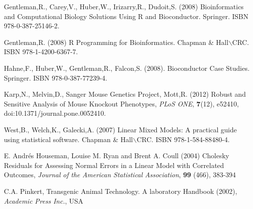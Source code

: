 \documentclass[12pt,a4paper]{article}
\begin{document}
\begin{thebibliography}{}

Gentleman,R., Carey,V., Huber,W., Irizarry,R., Dudoit,S.  (2008) Bioinformatics and Computational Biology Solutions Using R and Bioconductor. Springer.  ISBN 978-0-387-25146-2.

Gentleman,R. (2008) R Programming for Bioinformatics. Chapman \& Hall$\backslash$CRC. ISBN 978-1-4200-6367-7.

Hahne,F., Huber,W., Gentleman,R., Falcon,S. (2008). Bioconductor Case Studies. Springer.  ISBN 978-0-387-77239-4.

 Karp,N., Melvin,D., Sanger Mouse Genetics Project, Mott,R. (2012) Robust and Sensitive Analysis of Mouse Knockout Phenotypes, {\it PLoS ONE}, {\bf 7}(12), e52410, doi:10.1371/journal.pone.0052410.

  West,B., Welch,K., Galecki,A. (2007) Linear Mixed Models: A practical guide using statistical software. Chapman \& Hall$\backslash$CRC. ISBN 978-1-584-88480-4.

 E. Andrés Houseman, Louise M. Ryan and Brent A. Coull (2004) Cholesky Residuals for Assessing Normal Errors in a Linear Model with Correlated Outcomes, {\it Journal of the American Statistical Association}, {\bf 99} (466), 383-394

 C.A. Pinkert, Transgenic Animal Technology. A laboratory Handbook (2002), {\it Academic Press Inc.}, USA


\end{thebibliography}
\end{document}
